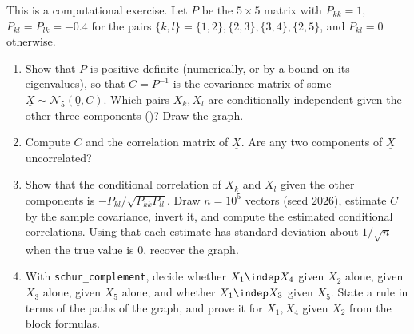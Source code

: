 \begin{exercise}\label{ex:gc-graphical}
\medium This is a computational exercise. Let $P$ be the $5\times5$ matrix with $P_{kk}=1$,
$P_{kl}=P_{lk}=-0.4$ for the pairs $\{k,l\}=\{1,2\},\{2,3\},\{3,4\},\{2,5\}$, and $P_{kl}=0$ otherwise.
\begin{enumerate}[label=(\alph*)]
  \item Show that $P$ is positive definite (numerically, or by a bound on its eigenvalues), so that
    $C=P^{-1}$ is the covariance matrix of some $\underline X\sim\mathcal N_5(\underline 0,C)$. Which pairs $X_k,X_l$ are
    conditionally independent given the other three components ()? Draw
    the graph.
  \item Compute $C$ and the correlation matrix of $\underline X$. Are any two components of $\underline X$ uncorrelated?
  \item Show that the conditional correlation of $X_k$ and $X_l$ given the other components is
    $-P_{kl}/\sqrt{P_{kk}P_{ll}}$. Draw $n=10^5$ vectors (seed $2026$), estimate $C$ by the sample
    covariance, invert it, and compute the estimated conditional correlations. Using that each
    estimate has standard deviation about $1/\sqrt n$ when the true value is $0$, recover the graph.
  \item With \texttt{schur\_complement}, decide whether $X_1\indep X_4$ given $X_2$ alone, given $X_3$
    alone, given $X_5$ alone, and whether $X_1\indep X_3$ given $X_5$. State a rule in terms of the
    paths of the graph, and prove it for $X_1,X_4$ given $X_2$ from the block formulas.
\end{enumerate}
\end{exercise}


